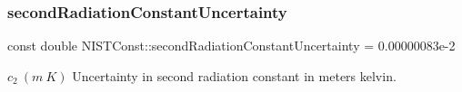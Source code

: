 \subsubsection{\texorpdfstring{second\+Radiation\+Constant\+Uncertainty}{secondRadiationConstantUncertainty}}
{\footnotesize\ttfamily const double N\+I\+S\+T\+Const\+::second\+Radiation\+Constant\+Uncertainty = 0.\+00000083e-\/2}

$c_2 \ (m\ K)$ Uncertainty in second radiation constant in meters kelvin. 